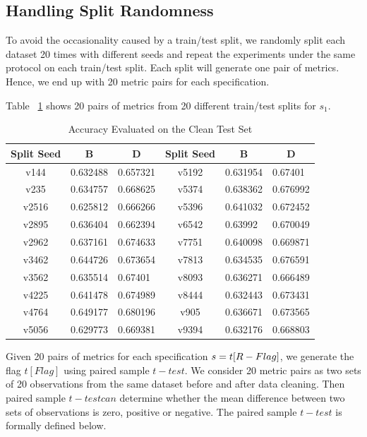 \subsection{Handling Split Randomness}
To avoid the occasionality caused by a train/test split, we randomly split each dataset 20 times with different seeds and repeat the experiments under the same protocol on each train/test split. Each split will generate one pair of metrics. Hence, we end up with
20 metric pairs for each specification.

\begin{example}
	Table ~\ref{tab:accuracy-evulated-on-the-clean-test-set} shows 20 pairs of metrics from 20 different train/test splits for $s_{1}$.
\end{example}

\begin{table}[H]
	\centering
	\begin{tabular}{|c|l|l|c|l|l|}
		\hline
		Split Seed & \multicolumn{1}{c|}{B} & \multicolumn{1}{c|}{D} & Split Seed & \multicolumn{1}{c|}{B} & \multicolumn{1}{c|}{D} \\ \hline
		v144 & 0.632488 & 0.657321 & v5192 & 0.631954 & 0.67401 \\ \hline
		v235 & 0.634757 & 0.668625 & v5374 & 0.638362 & 0.676992 \\ \hline
		v2516 & 0.625812 & 0.666266 & v5396 & 0.641032 & 0.672452 \\ \hline
		v2895 & 0.636404 & 0.662394 & v6542 & 0.63992 & 0.670049 \\ \hline
		v2962 & 0.637161 & 0.674633 & v7751 & 0.640098 & 0.669871 \\ \hline
		v3462 & 0.644726 & 0.673654 & v7813 & 0.634535 & 0.676591 \\ \hline
		v3562 & 0.635514 & 0.67401 & v8093 & 0.636271 & 0.666489 \\ \hline
		v4225 & 0.641478 & 0.674989 & v8444 & 0.632443 & 0.673431 \\ \hline
		v4764 & 0.649177 & 0.680196 & v905 & 0.636671 & 0.673565 \\ \hline
		v5056 & 0.629773 & 0.669381 & v9394 & 0.632176 & 0.668803 \\ \hline
	\end{tabular}
	\caption{Accuracy Evaluated on the Clean Test Set}
	\label{tab:accuracy-evulated-on-the-clean-test-set}
\end{table}

Given 20 pairs of metrics for each specification $s = t[R \-- Flag]$,
we generate the flag $t[Flag]$ using paired sample $t-test$. We consider 20 metric pairs as two sets of 20 observations from the same dataset before and after data cleaning. 
Then paired sample $t-test can$ determine whether the mean difference between two sets of
observations is zero, positive or negative. The paired sample $t-test$ is formally defined below. 


